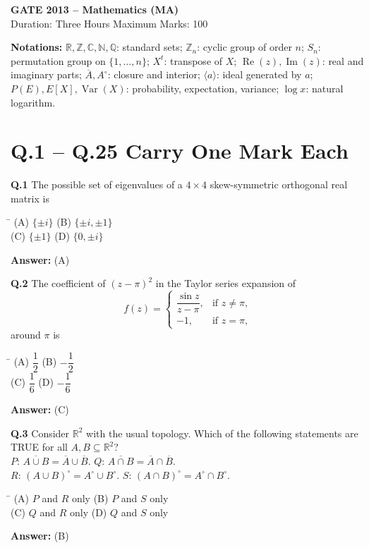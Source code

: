 \documentclass[11pt,a4paper]{article}
\newcommand{\optsfourA}[4]{%
  \begin{tabbing}
    \hspace{0.48\linewidth}\=\kill
    (A) #1 \> (B) #2 \\[2pt]
    (C) #3 \> (D) #4
  \end{tabbing}%
}
\newcommand{\ans}[1]{\textbf{Answer:} #1\par\medskip}
\begin{document}
\newpage


\begin{center}
  {\Large\bfseries GATE 2013 -- Mathematics (MA)}\\[4pt]
  {\small Duration: Three Hours \quad\textbar\quad Maximum Marks: 100}
\end{center}

\medskip
\textbf{Notations:} $\mathbb{R}, \mathbb{Z}, \mathbb{C}, \mathbb{N}, \mathbb{Q}$: standard sets; $\mathbb{Z}_n$: cyclic group of order $n$; $S_n$: permutation group on $\{1,\dots,n\}$; $X^t$: transpose of $X$; $\operatorname{Re}(z), \operatorname{Im}(z)$: real and imaginary parts; $\overline{A}, A^\circ$: closure and interior; $\langle a \rangle$: ideal generated by $a$; $P(E), E[X], \operatorname{Var}(X)$: probability, expectation, variance; $\log x$: natural logarithm.

\section*{Q.1 -- Q.25 Carry One Mark Each}

\textbf{Q.1} The possible set of eigenvalues of a $4 \times 4$ skew-symmetric orthogonal real matrix is
\optsfourA{$\{\pm i\}$}{$\{\pm i, \pm 1\}$}{$\{\pm 1\}$}{$\{0, \pm i\}$}
\ans{(A)}

\textbf{Q.2} The coefficient of $(z - \pi)^2$ in the Taylor series expansion of
\[
  f(z) = \begin{cases} \dfrac{\sin z}{z - \pi}, & \text{if } z \ne \pi, \\ -1, & \text{if } z = \pi, \end{cases}
\]
around $\pi$ is
\optsfourA{$\dfrac{1}{2}$}{$-\dfrac{1}{2}$}{$\dfrac{1}{6}$}{$-\dfrac{1}{6}$}
\ans{(C)}

\textbf{Q.3} Consider $\mathbb{R}^2$ with the usual topology. Which of the following statements are TRUE for all $A, B \subseteq \mathbb{R}^2$?\\
$P$: $\overline{A \cup B} = \overline{A} \cup \overline{B}$. \qquad $Q$: $\overline{A \cap B} = \overline{A} \cap \overline{B}$.\\
$R$: $(A \cup B)^\circ = A^\circ \cup B^\circ$. \qquad $S$: $(A \cap B)^\circ = A^\circ \cap B^\circ$.
\optsfourA{$P$ and $R$ only}{$P$ and $S$ only}{$Q$ and $R$ only}{$Q$ and $S$ only}
\ans{(B)}
\end{document}
